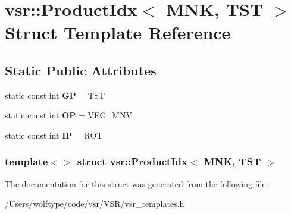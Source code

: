\hypertarget{structvsr_1_1_product_idx_3_01_m_n_k_00_01_t_s_t_01_4}{\section{vsr\-:\-:Product\-Idx$<$ M\-N\-K, T\-S\-T $>$ Struct Template Reference}
\label{structvsr_1_1_product_idx_3_01_m_n_k_00_01_t_s_t_01_4}
}
\subsection*{Static Public Attributes}
\begin{DoxyCompactItemize}
\item 
\hypertarget{structvsr_1_1_product_idx_3_01_m_n_k_00_01_t_s_t_01_4_a9077e195aba6c64bd649a77697d061f2}{static const int {\bfseries G\-P} = T\-S\-T}\label{structvsr_1_1_product_idx_3_01_m_n_k_00_01_t_s_t_01_4_a9077e195aba6c64bd649a77697d061f2}

\item 
\hypertarget{structvsr_1_1_product_idx_3_01_m_n_k_00_01_t_s_t_01_4_a1388f439e2fd59d0a7735bd81a072ac7}{static const int {\bfseries O\-P} = V\-E\-C\-\_\-\-M\-N\-V}\label{structvsr_1_1_product_idx_3_01_m_n_k_00_01_t_s_t_01_4_a1388f439e2fd59d0a7735bd81a072ac7}

\item 
\hypertarget{structvsr_1_1_product_idx_3_01_m_n_k_00_01_t_s_t_01_4_a9f7b1caa3daf4b91c8fb49bf2786bff7}{static const int {\bfseries I\-P} = R\-O\-T}\label{structvsr_1_1_product_idx_3_01_m_n_k_00_01_t_s_t_01_4_a9f7b1caa3daf4b91c8fb49bf2786bff7}

\end{DoxyCompactItemize}
\subsubsection*{template$<$$>$ struct vsr\-::\-Product\-Idx$<$ M\-N\-K, T\-S\-T $>$}



The documentation for this struct was generated from the following file\-:\begin{DoxyCompactItemize}
\item 
/\-Users/wolftype/code/vsr/\-V\-S\-R/vsr\-\_\-templates.\-h\end{DoxyCompactItemize}
